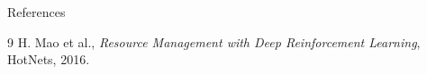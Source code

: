\documentclass[aspectratio=169]{beamer}  %
\begin{document}
\begin{frame}[allowframebreaks]{References}
  \begin{thebibliography}{9}
      H. Mao et al.,
      \textit{Resource Management with Deep Reinforcement Learning},
      HotNets, 2016.
  \end{thebibliography}

\end{frame}
\end{document}
